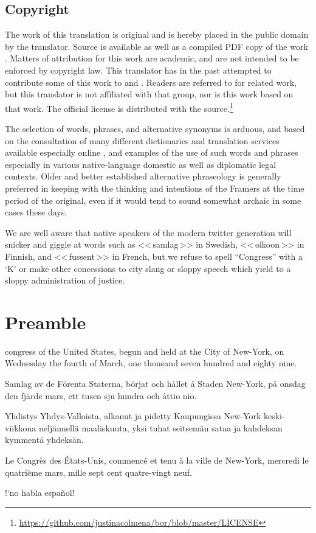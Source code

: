 \documentclass[a4paper,landscape,10pt]{article}
\newcommand{\tblock}[5]{\noindent\begin{minipage}[t]{0.18\textwidth}\foreignlanguage{english}{#1}\end{minipage}\hskip 0.025\textwidth\begin{minipage}[t]{0.18\textwidth}\foreignlanguage{swedish}{#2}\end{minipage}\hskip 0.025\textwidth\begin{minipage}[t]{0.18\textwidth}\foreignlanguage{finnish}{#3}\end{minipage}\hskip 0.025\textwidth\begin{minipage}[t]{0.18\textwidth}\foreignlanguage{french}{#4}\end{minipage}\hskip 0.025\textwidth\begin{minipage}[t]{0.18\textwidth}\foreignlanguage{spanish}{#5}\end{minipage}}
\begin{document}
\begin{multicols}{3}
\section*{Copyright}

The work of this translation is original and is hereby placed in the public domain by the translator. Source \cite{src} is available as well as a compiled PDF copy of the work \cite{doc}. Matters of attribution for this work are academic, and are not intended to be enforced by copyright law. This translator has in the past attempted to contribute some of this work to \cite{wp-bor-sv} and \cite{wp-bor-fi}. Readers are referred to \cite{jpfo-bor} for related work, but this translator is not affiliated with that group, nor is this work based on that work.  The official license is distributed with the source.\footnote{\url{https://github.com/justinacolmena/bor/blob/master/LICENSE}}

	The selection of words, phrases, and alternative synonyms is arduous, and based on the consultation of many different dictionaries and translation services available especially online \cite[etc.]{bab.la,google-translate,collins-en-fr,lexilogos-fr,free-en-fi,lexilogos-fi}, and examples of the use of such words and phrases especially in various native-language domestic as well as diplomatic legal contexts. Older and better established alternative phraseology is generally preferred in keeping with the thinking and intentions of the Framers at the time period of the original, even if it would tend to sound somewhat archaic in some cases these days.

	We are well aware that native speakers of the modern twitter generation will snicker and giggle at words such as \foreignlanguage{swedish}{<<\,samlag\,>>} in Swedish, \foreignlanguage{finnish}{<<\,olkoon\,>>} in Finnish, and \foreignlanguage{french}{<<\,fussent\,>>} in French, but we refuse to spell ``Congress'' with a `K' or make other concessions to city slang or sloppy speech which yield to a sloppy administration of justice.
\end{multicols}

\section*{Preamble}

\tblock
{\Gls{congress} of the United States, begun and held at the City of New-York, on Wednesday the fourth of March, one thousand seven hundred and eighty nine.}
{Samlag av de Förenta Staterna, börjat och hållet å Staden New-York, på onsdag den fjärde mars, ett tusen sju hundra och åttio nio.}
{Yhdistys Yhdys-Valloista, alkanut ja pidetty Kaupungissa New-York keski-viikkona neljännellä maaliskuuta, yksi tuhat seitsemän sataa ja kahdeksan kymmentä yhdeksän.}
{Le Congrès des États-Unis, commencé et tenu à la ville de New-York, mercredi le quatrième mars, mille sept cent quatre-vingt neuf.}
{!`no habla español!}
\end{document}
